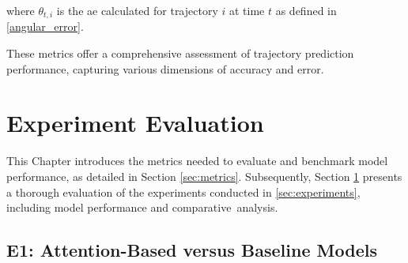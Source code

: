 where \(\theta_{t,i}\) is the \gls{ae} calculated for trajectory \(i\) at time \(t\) as defined in \eqref{angular_error}.

These metrics offer a comprehensive assessment of trajectory prediction performance, capturing various dimensions of accuracy and error.
\FloatBarrier

\section{Experiment Evaluation}
\label{sec:eval}
This Chapter introduces the metrics needed to evaluate and benchmark model performance, as detailed in Section \ref{sec:metrics}. Subsequently, Section \ref{sec:eval} presents a thorough evaluation of the experiments conducted in \ref{sec:experiments}, including model performance and comparative~analysis.

\subsection{E1: Attention-Based versus Baseline Models}

